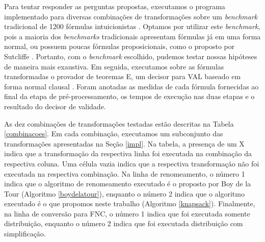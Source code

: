 \indent

Para tentar responder as perguntas propostas, executamos o programa implementado para diversas combinações de transformações sobre um \textit{benchmark} tradicional de 1200 fórmulas intuicionistas \cite{raths07jar}. Optamos por utilizar este \emph{benchmark}, pois a maioria dos \emph{benchmarks} tradicionais apresentam fórmulas já em uma forma normal, ou possuem poucas fórmulas proposicionais, como o proposto por Sutcliffe \cite{sutcliffe09jar}. Portanto, com o \textit{benchmark} escolhido, pudemos testar nossas hipóteses de maneira mais exaustiva. Em seguida, executamos sobre as fórmulas transformadas o provador de teoremas E, um decisor para VAL baseado em forma normal clausal \cite{Schulz:LPAR-2013}. Foram anotadas as medidas de cada fórmula fornecidas ao final da etapa de pré-processamento, os tempos de execução nas duas etapas e o resultado do decisor de validade.

As dez combinações de transformações testadas estão descritas na Tabela \ref{combinacoes}. Em cada combinação, executamos um subconjunto das transformações apresentadas na Seção \ref{impl}. Na tabela, a presença de um X indica que a transformação da respectiva linha foi executada na combinação da respectiva coluna. Uma célula vazia indica que a respectiva transformação não foi executada na respectiva combinação. Na linha de renomeamento, o número 1 indica que o algoritmo de renomeamento executado é o proposto por Boy de la Tour (Algoritmo \ref{boydelatour}), enquanto o número 2 indica que o algoritmo executado é o que propomos neste trabalho (Algoritmo \ref{knapsack}). Finalmente, na linha de conversão para FNC, o número 1 indica que foi executada somente distribuição, enquanto o número 2 indica que foi executada distribuição com simplificação.


